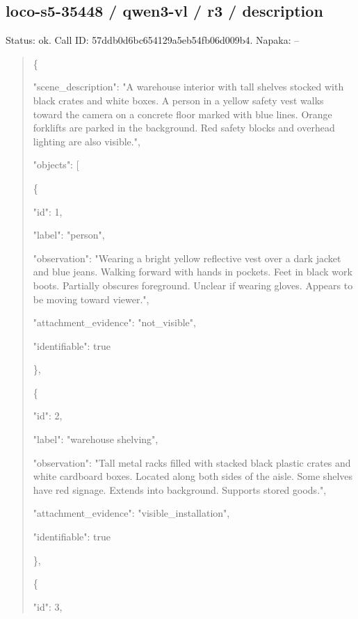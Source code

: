 \documentclass[10pt,a4paper]{article}
\begin{document}
\subsection*{loco-s5-35448 / qwen3-vl / r3 / description}
Status: ok. Call ID: 57ddb0d6bc654129a5eb54fb06d009b4. Napaka: --
\begin{quote}\footnotesize
\{\par
  "scene\_description":\allowbreak{} "A warehouse interior with tall shelves stocked with black crates and white boxes. A person in a yellow safety vest walks toward the camera on a concrete floor marked with blue lines. Orange forklifts are parked in the background. Red safety blocks and overhead lighting are also visible.",\allowbreak{}\par
  "objects":\allowbreak{} [\par
    \{\par
      "id":\allowbreak{} 1,\allowbreak{}\par
      "label":\allowbreak{} "person",\allowbreak{}\par
      "observation":\allowbreak{} "Wearing a bright yellow reflective vest over a dark jacket and blue jeans. Walking forward with hands in pockets. Feet in black work boots. Partially obscures foreground. Unclear if wearing gloves. Appears to be moving toward viewer.",\allowbreak{}\par
      "attachment\_evidence":\allowbreak{} "not\_visible",\allowbreak{}\par
      "identifiable":\allowbreak{} true\par
    \},\allowbreak{}\par
    \{\par
      "id":\allowbreak{} 2,\allowbreak{}\par
      "label":\allowbreak{} "warehouse shelving",\allowbreak{}\par
      "observation":\allowbreak{} "Tall metal racks filled with stacked black plastic crates and white cardboard boxes. Located along both sides of the aisle. Some shelves have red signage. Extends into background. Supports stored goods.",\allowbreak{}\par
      "attachment\_evidence":\allowbreak{} "visible\_installation",\allowbreak{}\par
      "identifiable":\allowbreak{} true\par
    \},\allowbreak{}\par
    \{\par
      "id":\allowbreak{} 3,\allowbreak{}\par

\end{quote}
\end{document}
